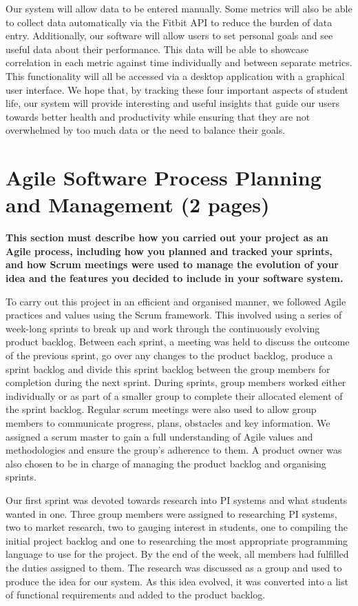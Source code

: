 \documentclass[12pt]{article}
\begin{document}
Our system will allow data to be entered manually. Some metrics will also be able to collect data automatically via the Fitbit API to reduce the burden of data entry. Additionally, our software will allow users to set personal goals and see useful data about their performance. This data will be able to showcase correlation in each metric against time individually and between separate metrics. This functionality will all be accessed via a desktop application with a graphical user interface. We hope that, by tracking these four important aspects of student life, our system will provide interesting and useful insights that guide our users towards better health and productivity while ensuring that they are not overwhelmed by too much data or the need to balance their goals.


\section{Agile Software Process Planning and Management (2 pages)}
\textbf{This section must describe how you carried out your project as an Agile process, including
how you planned and tracked your sprints, and how Scrum meetings were used to manage
the evolution of your idea and the features you decided to include in your software system.}\par
To carry out this project in an efficient and organised manner, we followed Agile practices and values using the Scrum framework. This involved using a series of week-long sprints to break up and work through the continuously evolving product backlog. Between each sprint, a meeting was held to discuss the outcome of the previous sprint, go over any changes to the product backlog, produce a sprint backlog and divide this sprint backlog between the group members for completion during the next sprint. During sprints, group members worked either individually or as part of a smaller group to complete their allocated element of the sprint backlog. Regular scrum meetings were also used to allow group members to communicate progress, plans, obstacles and key information. We assigned a scrum master to gain a full understanding of Agile values and methodologies and ensure the group's adherence to them. A product owner was also chosen to be in charge of managing the product backlog and organising sprints.\par

Our first sprint was devoted towards research into PI systems and what students wanted in one. Three group members were assigned to researching PI systems, two to market research, two to gauging interest in students, one to compiling the initial project backlog and one to researching the most appropriate programming language to use for the project. By the end of the week, all members had fulfilled the duties assigned to them. The research was discussed as a group and used to produce the idea for our system. As this idea evolved, it was converted into a list of functional requirements and added to the product backlog.\par
\end{document}
